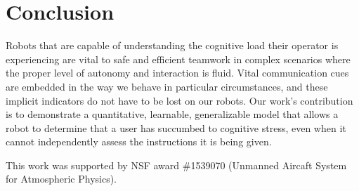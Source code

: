 \documentclass{sig-alternate-05-2015}
\begin{document}


\section{Conclusion}

Robots that are capable of understanding the cognitive load their
operator is experiencing are vital to safe and efficient teamwork in
complex scenarios where the proper level of autonomy and interaction
is fluid.  Vital communication cues are embedded in the way we behave
in particular circumstances, and these implicit indicators do not have
to be lost on our robots.  Our work's contribution is to demonstrate a
quantitative, learnable, generalizable model that allows a robot to
determine that a user has succumbed to cognitive stress, even when it
cannot independently assess the instructions it is being given.

This work was supported by NSF award \#1539070 (Unmanned Aircaft
System for Atmospheric Physics).


%

\end{document}
